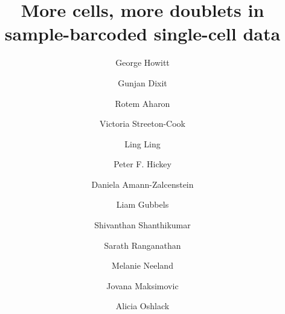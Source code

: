 \documentclass[unnumsec,webpdf,modern,large]{oup-authoring-template}
\begin{document}
	
	
	
	
	\title[Finding multiplets]{More cells, more doublets in sample-barcoded single-cell data}
	
	\author[1, 2]{George Howitt}
	\author[1, 2]{Gunjan Dixit}
	\author[1,2]{Rotem Aharon}
	\author[1]{Victoria Streeton-Cook}
	\author[3]{Ling Ling}
	\author[3,4]{Peter F. Hickey}
	\author[3,4]{Daniela Amann-Zalcenstein}
	\author[5]{Liam Gubbels}
	\author[5,6,7]{Shivanthan Shanthikumar}
	\author[5,6,7]{Sarath Ranganathan}
	\author[5,6]{Melanie Neeland}
	\author[1, 2]{Jovana Maksimovic}
	\author[1, 2, 8,$\ast$]{Alicia Oshlack}
	
	
	\address[1]{Computational Biology Program, Peter MacCallum Cancer Centre, Parkville, VIC, Australia}
	\address[2]{Sir Peter MacCallum Department of Oncology, University of Melbourne, Parkville, VIC, Australia}
	\address[3]{Respiratory Diseases, Murdoch Children’s Research Institute, Parkville, VIC, Australia}
	\address[4]{Department of Medical Biology, University of Melbourne, Parkville, VIC, Australia}
	\address[5]{Respiratory Diseases, Murdoch Children’s Research Institute, Parkville, VIC, Australia}
	\address[6]{Respiratory and Sleep Medicine, Royal Children’s Hospital, Parkville, VIC, Australia}
	\address[7]{Department of Paediatrics, University of Melbourne, Parkville, VIC, Australia}
	\address[8]{School of Mathematics and Statistics, University of Melbourne, Parkville, VIC, Australia}
		
		
	
	
	
\end{document}
